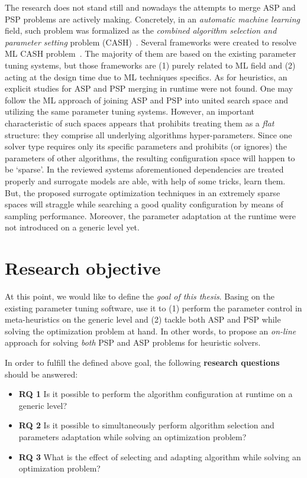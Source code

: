 The research does not stand still and nowadays the attempts to merge ASP and PSP problems are actively making. Concretely, in an \emph{automatic machine learning} field, such problem was formalized as the \emph{combined algorithm selection and parameter setting} problem (CASH)~\cite{thornton2013auto}. Several frameworks were created to resolve ML CASH problem~\cite{thornton2013auto,feurer2015efficient,olson2019tpot}. The majority of them are based on the existing parameter tuning systems, but those frameworks are (1) purely related to ML field and (2) acting at the design time due to ML techniques specifics. As for heuristics, an explicit studies for ASP and PSP merging in runtime were not found. One may follow the ML approach of joining ASP and PSP into united search space and utilizing the same parameter tuning systems. However, an important characteristic of such spaces appears that prohibits treating them as a \emph{flat} structure: they comprise all underlying algorithms hyper-parameters. Since one solver type requires only its specific parameters and prohibits (or ignores) the parameters of other algorithms, the resulting configuration space will happen to be `sparse'. In the reviewed systems aforementioned dependencies are treated properly and surrogate models are able, with help of some tricks, learn them. But, the proposed surrogate optimization techniques in an extremely sparse spaces will straggle while searching a good quality configuration by means of sampling performance. Moreover, the parameter adaptation at the runtime were not introduced on a generic level yet. 


\section{Research objective}\label{intro: research objective}
At this point, we would like to define the \emph{goal of this thesis}. Basing on the existing parameter tuning software, use it to (1) perform the parameter control in meta-heuristics on the generic level and (2) tackle both ASP and PSP while solving the optimization problem at hand. In other words, to propose an \emph{on-line} approach for solving \emph{both} PSP and ASP problems for heuristic solvers.

In order to fulfill the defined above goal, the following \textbf{research questions} should be answered:
\begin{itemize}
	\item \textbf{RQ 1} Is it possible to perform the algorithm configuration at runtime on a generic level?
	
	\item \textbf{RQ 2} Is it possible to simultaneously perform algorithm selection and parameters adaptation while solving an optimization problem?
	
	\item \textbf{RQ 3} What is the effect of selecting and adapting algorithm while solving an optimization problem?
\end{itemize}


